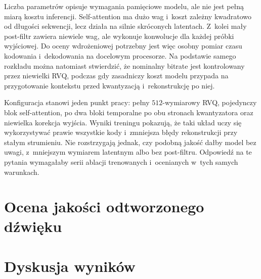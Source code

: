 Liczba parametrów opisuje wymagania pamięciowe modelu, ale nie jest pełną miarą kosztu inferencji. Self-attention ma dużo wag i~koszt zależny kwadratowo od długości sekwencji, lecz działa na silnie skróconych latentach. Z~kolei mały post-filtr zawiera niewiele wag, ale wykonuje konwolucje dla każdej próbki wyjściowej. Do oceny wdrożeniowej potrzebny jest więc osobny pomiar czasu kodowania i~dekodowania na docelowym procesorze. Na podstawie samego rozkładu można natomiast stwierdzić, że nominalny bitrate jest kontrolowany przez niewielki RVQ, podczas gdy zasadniczy koszt modelu przypada na przygotowanie kontekstu przed kwantyzacją i~rekonstrukcję po niej.

Konfiguracja stanowi jeden punkt pracy: pełny \(512\)-wymiarowy RVQ, pojedynczy blok self-attention, po dwa bloki temporalne po obu stronach kwantyzatora oraz niewielka korekcja wyjścia. Wyniki treningu pokazują, że taki układ uczy się wykorzystywać prawie wszystkie kody i~zmniejsza błędy rekonstrukcji przy stałym strumieniu. Nie rozstrzygają jednak, czy podobną jakość dałby model bez uwagi, z~mniejszym wymiarem latentnym albo bez post-filtru. Odpowiedź na te pytania wymagałaby serii ablacji trenowanych i~ocenianych w~tych samych warunkach.

\clearpage
\section{Ocena jakości odtworzonego dźwięku}
\label{sec:ocena-jakosci}


\section{Dyskusja wyników}
\label{sec:dyskusja-wynikow}

